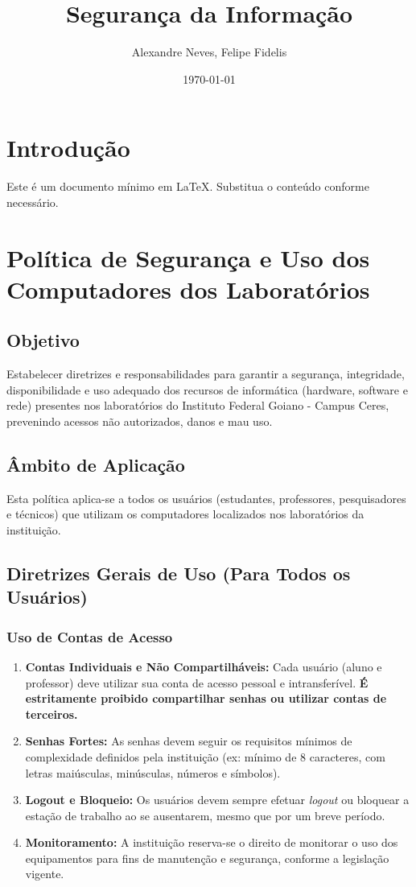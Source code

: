 \documentclass[12pt]{article}
\title{Segurança da Informação}
\author{Alexandre Neves, Felipe Fidelis}
\date{\today}
\begin{document}
\maketitle

\section{Introdução}
Este é um documento mínimo em LaTeX. Substitua o conteúdo conforme necessário.

\section{Política de Segurança e Uso dos Computadores dos Laboratórios}

\subsection{Objetivo}

Estabelecer diretrizes e responsabilidades para garantir a segurança, integridade, disponibilidade e uso adequado dos recursos de informática (hardware, software e rede) presentes nos laboratórios do Instituto Federal Goiano - Campus Ceres, prevenindo acessos não autorizados, danos e mau uso.

\subsection{Âmbito de Aplicação}

Esta política aplica-se a todos os usuários (estudantes, professores, pesquisadores e técnicos) que utilizam os computadores localizados nos laboratórios da instituição.

\subsection{Diretrizes Gerais de Uso (Para Todos os Usuários)}

\subsubsection{Uso de Contas de Acesso}
\begin{enumerate}
    \item \textbf{Contas Individuais e Não Compartilháveis:} Cada usuário (aluno e professor) deve utilizar sua conta de acesso pessoal e intransferível. \textbf{É estritamente proibido compartilhar senhas ou utilizar contas de terceiros.}
    \item \textbf{Senhas Fortes:} As senhas devem seguir os requisitos mínimos de complexidade definidos pela instituição (ex: mínimo de 8 caracteres, com letras maiúsculas, minúsculas, números e símbolos).
    \item \textbf{Logout e Bloqueio:} Os usuários devem sempre efetuar \emph{logout} ou bloquear a estação de trabalho ao se ausentarem, mesmo que por um breve período.
    \item \textbf{Monitoramento:} A instituição reserva-se o direito de monitorar o uso dos equipamentos para fins de manutenção e segurança, conforme a legislação vigente.
\end{enumerate}
\end{document}

